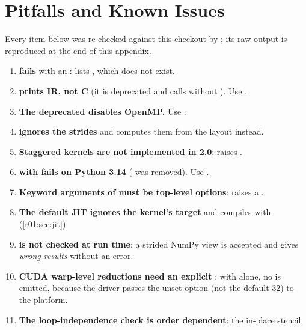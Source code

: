 \chapter{Pitfalls and Known Issues}\label{r01:app:pitfalls}

Every item below was re-checked against this checkout by ;
its raw output is reproduced at the end of this appendix.

\begin{enumerate}
  \item \textbf{ fails} with an :
         lists , which does not exist.
  \item \textbf{ prints IR, not C} (it is deprecated and calls
         without ). Use .
  \item \textbf{The deprecated  disables OpenMP.}
        Use .
  \item \textbf{ ignores the
        strides} and computes them from the layout instead.
  \item \textbf{Staggered kernels are not implemented in 2.0}:
         raises .
  \item \textbf{ with  fails on Python 3.14}
        ( was removed). Use .
  \item \textbf{Keyword arguments of  must be top-level options}:
         raises a .
  \item \textbf{The default JIT ignores the kernel's target} and compiles with
         (\cref{r01:sec:jit}).
  \item \textbf{ is not checked at run time}: a strided
        NumPy view is accepted and gives \emph{wrong results} without an error.
  \item \textbf{CUDA warp-level reductions need an explicit }: with
         alone, no  is
        emitted, because the driver passes the unset option (not the default 32) to the
        platform.
  \item \textbf{The loop-independence check is order dependent}: the in-place stencil

\end{enumerate}
